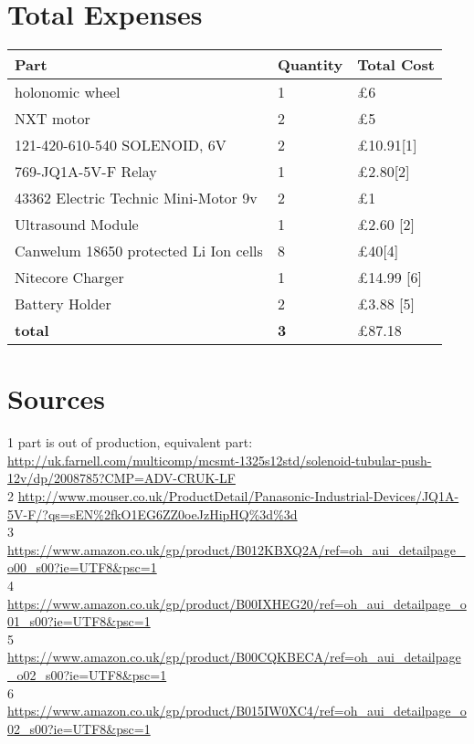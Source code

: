 \section {Total Expenses}
\begin{center}
\begin{tabular}{ | m{3cm} | m{3cm}| m{6cm} | }
\hline
\textbf{Part} & \textbf{Quantity} & \textbf{Total Cost} \\
\hline
holonomic wheel & 1 & £6 \\
\hline
NXT motor       & 2 & £5 \\
\hline
121-420-610-540  SOLENOID, 6V & 2 &  £10.91[1] \\
\hline
769-JQ1A-5V-F Relay & 1 &  £2.80[2] \\
\hline

43362 Electric Technic Mini-Motor 9v & 2 & £1 \\
\hline
Ultrasound Module       & 1 & £2.60 [2]\\
\hline

Canwelum 18650 protected Li Ion cells & 8 &  £40[4] \\
\hline
Nitecore Charger & 1 & £14.99 [6]\\
\hline
Battery Holder & 2 & £3.88 [5]\\
\hline
\textbf{total} & \textbf{3} & £87.18 \\
\hline
\end{tabular}
\end{center}


\section{Sources}
1 part is out of production, equivalent part: \url{http://uk.farnell.com/multicomp/mcsmt-1325s12std/solenoid-tubular-push-12v/dp/2008785?CMP=ADV-CRUK-LF} \\
2 \url{http://www.mouser.co.uk/ProductDetail/Panasonic-Industrial-Devices/JQ1A-5V-F/?qs=sEN\%2fkO1EG6ZZ0oeJzHipHQ\%3d\%3d}\\ 
3 \url{https://www.amazon.co.uk/gp/product/B012KBXQ2A/ref=oh_aui_detailpage_o00_s00?ie=UTF8&psc=1}\\
4 \url{https://www.amazon.co.uk/gp/product/B00IXHEG20/ref=oh_aui_detailpage_o01_s00?ie=UTF8&psc=1}\\
5 \url{https://www.amazon.co.uk/gp/product/B00CQKBECA/ref=oh_aui_detailpage_o02_s00?ie=UTF8&psc=1}\\
6 \url{https://www.amazon.co.uk/gp/product/B015IW0XC4/ref=oh_aui_detailpage_o02_s00?ie=UTF8&psc=1}\\